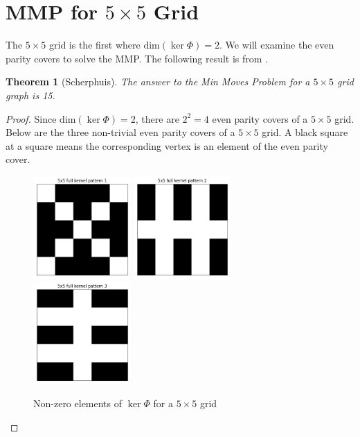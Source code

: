 \documentclass[a4paper]{article}
\newtheorem{theorem}{Theorem}
\renewcommand{\dim}[1]{\text{dim}\left( #1 \right)}
\begin{document}
	\section{MMP for $5 \times 5$ Grid}
	The $5 \times 5$ grid is the first where $\dim{\ker{\Phi}} = 2$.
	We will examine the even parity covers to solve the MMP.
	The following result is from \cite{jaap}.
	\begin{theorem}[Scherphuis]\label{min-moves-problem-5x5}
		The answer to the Min Moves Problem for a $5 \times 5$ grid graph is 15.
	\end{theorem}
	\begin{proof}
		Since $\dim{\ker{\Phi}} = 2$, there are $2^2 = 4$ even parity covers of a $5 \times 5$ grid.
		Below are the three non-trivial even parity covers of a $5 \times 5$ grid.
		A black square at a square means the corresponding vertex is an element of the even parity cover.
		
		\begin{figure}[H]
			\centering
			\includegraphics[width=0.33\textwidth]{../../code/serialization/kernels/5x5/full/5x5_kernel_full_1.png}
			\includegraphics[width=0.33\textwidth]{../../code/serialization/kernels/5x5/full/5x5_kernel_full_2.png}
			\includegraphics[width=0.33\textwidth]{../../code/serialization/kernels/5x5/full/5x5_kernel_full_3.png}
			\caption{Non-zero elements of $\ker{\Phi}$ for a $5 \times 5$ grid}
		\end{figure}
	

\end{proof}
\end{document}
